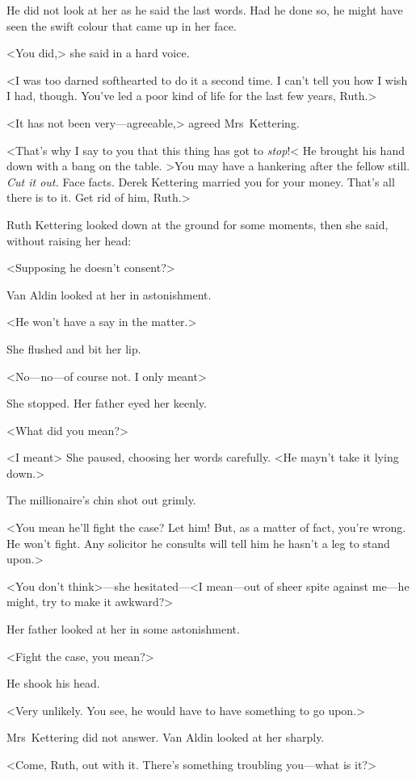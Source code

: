 He did not look at her as he said the last words. Had he done so, he might have seen the swift colour that came up in her face.

<You did,> she said in a hard voice.

<I was too darned softhearted to do it a second time. I can't tell you how I wish I had, though. You've led a poor kind of life for the last few years, Ruth.>

<It has not been very—agreeable,> agreed Mrs~Kettering.

<That's why I say to you that this thing has got to \emph{stop}!< He brought his hand down with a bang on the table. >You may have a hankering after the fellow still. \emph{Cut it out.} Face facts. Derek Kettering married you for your money. That's all there is to it. Get rid of him, Ruth.>

Ruth Kettering looked down at the ground for some moments, then she said, without raising her head:

<Supposing he doesn't consent?>

Van Aldin looked at her in astonishment.

<He won't have a say in the matter.>

She flushed and bit her lip.

<No—no—of course not. I only meant\longdash>

She stopped. Her father eyed her keenly.

<What did you mean?>

<I meant\longdash> She paused, choosing her words carefully. <He mayn't take it lying down.>

The millionaire's chin shot out grimly.

<You mean he'll fight the case? Let him! But, as a matter of fact, you're wrong. He won't fight. Any solicitor he consults will tell him he hasn't a leg to stand upon.>

<You don't think>—she hesitated—<I mean—out of sheer spite against me—he might, try to make it awkward?>

Her father looked at her in some astonishment.

<Fight the case, you mean?>

He shook his head.

<Very unlikely. You see, he would have to have something to go upon.>

Mrs~Kettering did not answer. Van Aldin looked at her sharply.

<Come, Ruth, out with it. There's something troubling you—what is it?>

